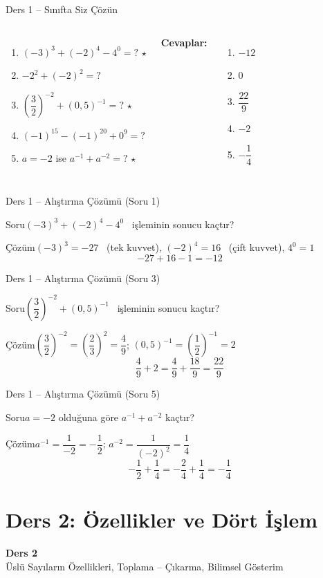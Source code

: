 \documentclass[aspectratio=169,11pt,handout]{beamer}
\newcommand{\soru}[3]{%
\begin{frame}{#1}
  \begin{block}{Soru}\large #2\end{block}
  \pause
  \begin{exampleblock}{Çözüm}\large #3\end{exampleblock}
\end{frame}}
\begin{document}
\begin{frame}{Ders 1 -- Sınıfta Siz Çözün}
\begin{columns}[t]
\begin{enumerate}
\item \((-3)^3+(-2)^4-4^0=?\) \(\star\)
\item \(-2^2+(-2)^2=?\)
\item \(\left(\dfrac32\right)^{-2}+(0{,}5)^{-1}=?\) \(\star\)
\item \((-1)^{15}-(-1)^{20}+0^9=?\)
\item \(a=-2\) ise \(a^{-1}+a^{-2}=?\) \(\star\)
\end{enumerate}
\pause
\textbf{Cevaplar:}
\begin{enumerate}
\item \(-12\)
\item \(0\)
\item \(\dfrac{22}{9}\)
\item \(-2\)
\item \(-\dfrac14\)
\end{enumerate}
\end{columns}
\vspace{4pt}{\footnotesize \(\star\) işaretli soruların adım adım çözümü sonraki slaytlardadır.}
\end{frame}

\soru{Ders 1 -- Alıştırma Çözümü (Soru 1)}
{\((-3)^3+(-2)^4-4^0\) \ işleminin sonucu kaçtır?}
{\((-3)^3=-27\) \ (tek kuvvet), \quad \((-2)^4=16\) \ (çift kuvvet), \quad \(4^0=1\)
\[-27+16-1=-12\]}

\soru{Ders 1 -- Alıştırma Çözümü (Soru 3)}
{\(\left(\dfrac32\right)^{-2}+(0{,}5)^{-1}\) \ işleminin sonucu kaçtır?}
{\(\left(\dfrac32\right)^{-2}=\left(\dfrac23\right)^{2}=\dfrac49\); \qquad \((0{,}5)^{-1}=\left(\dfrac12\right)^{-1}=2\)
\[\frac49+2=\frac49+\frac{18}{9}=\frac{22}{9}\]}

\soru{Ders 1 -- Alıştırma Çözümü (Soru 5)}
{\(a=-2\) olduğuna göre \(a^{-1}+a^{-2}\) kaçtır?}
{\(a^{-1}=\dfrac{1}{-2}=-\dfrac12\); \qquad \(a^{-2}=\dfrac{1}{(-2)^2}=\dfrac14\)
\[-\frac12+\frac14=-\frac24+\frac14=-\frac14\]}


\section{Ders 2: Özellikler ve Dört İşlem}
\begin{frame}
\centering\Large\color{anamavi}\textbf{Ders 2}\\[6pt]\normalsize Üslü Sayıların Özellikleri, Toplama -- Çıkarma, Bilimsel Gösterim
\end{frame}
\end{document}

